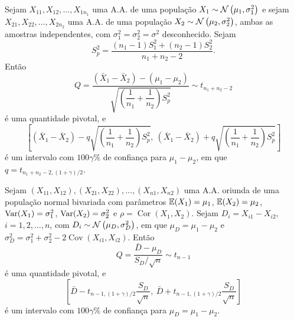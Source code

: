 \begin{theorem}[IC para a diferença de médias — $\sigma_1^2=\sigma_2^2=\sigma^2$ desconhecido]
Sejam $X_{11},X_{12},\ldots,X_{1n_1}$ uma A.A. de uma população $X_1\sim\normdist{\mu_1,\sigma_1^2}$ e sejam $X_{21},X_{22},\ldots,X_{2n_2}$ uma A.A. de uma população $X_2\sim\normdist{\mu_2,\sigma_2^2}$, ambas as amostras independentes, com $\sigma_1^2=\sigma_2^2=\sigma^2$ desconhecido. Sejam
\begin{equation}
S_p^2 = \frac{(n_1-1)S_1^2+(n_2-1)S_2^2}{n_1+n_2-2}.
\end{equation}
Então
\begin{equation}
Q = \frac{(\bar{X}_1-\bar{X}_2)-(\mu_1-\mu_2)}{\sqrt{\left(\dfrac{1}{n_1}+\dfrac{1}{n_2}\right)S_p^2}} \sim t_{n_1+n_2-2}
\end{equation}
é uma quantidade pivotal, e
\begin{equation}
\left[(\bar{X}_1-\bar{X}_2)-q\sqrt{\left(\frac{1}{n_1}+\frac{1}{n_2}\right)S_p^2},\ (\bar{X}_1-\bar{X}_2)+q\sqrt{\left(\frac{1}{n_1}+\frac{1}{n_2}\right)S_p^2}\right]
\end{equation}
é um intervalo com $100\gamma\%$ de confiança para $\mu_1-\mu_2$, em que $q=t_{n_1+n_2-2,(1+\gamma)/2}$.
\end{theorem}

\begin{theorem}
Sejam $(X_{11},X_{12}),(X_{21},X_{22}),\ldots,(X_{n1},X_{n2})$ uma A.A. oriunda de uma população normal bivariada com parâmetros $\operatorname{\mathbb{E}}(X_1)=\mu_1$, $\operatorname{\mathbb{E}}(X_2)=\mu_2$, $\operatorname{Var}(X_1)=\sigma_1^2$, $\operatorname{Var}(X_2)=\sigma_2^2$ e $\rho=\operatorname{Cor}(X_1,X_2)$. Sejam $D_i=X_{i1}-X_{i2}$, $i=1,2,\ldots,n$, com $D_i\sim\normdist{\mu_D,\sigma_D^2}$, em que $\mu_D=\mu_1-\mu_2$ e $\sigma_D^2=\sigma_1^2+\sigma_2^2-2\operatorname{Cov}(X_{i1},X_{i2})$. Então
\begin{equation}
Q = \frac{\bar{D}-\mu_D}{S_D/\sqrt{n}} \sim t_{n-1}
\end{equation}
é uma quantidade pivotal, e
\begin{equation}
\left[\bar{D}-t_{n-1,(1+\gamma)/2}\frac{S_D}{\sqrt{n}},\ \bar{D}+t_{n-1,(1+\gamma)/2}\frac{S_D}{\sqrt{n}}\right]
\end{equation}
é um intervalo com $100\gamma\%$ de confiança para $\mu_D=\mu_1-\mu_2$.
\end{theorem}

